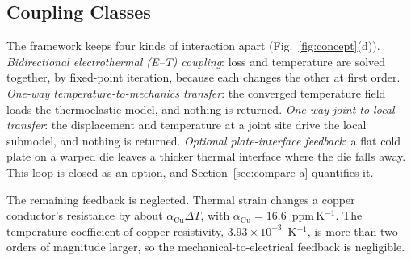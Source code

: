 \subsection{Coupling Classes}\label{sec:fw-coupling}
The framework keeps four kinds of interaction apart (Fig.~\ref{fig:concept}(d)).
\emph{Bidirectional electrothermal (E--T) coupling}: loss and temperature are solved
together, by fixed-point iteration, because each changes the other at first order. \emph{One-way temperature-to-mechanics
transfer}: the converged temperature field loads the thermoelastic model, and nothing is returned.
\emph{One-way joint-to-local transfer}: the displacement and temperature at a joint site drive the
local submodel, and nothing is returned. \emph{Optional plate-interface feedback}: a flat cold
plate on a warped die leaves a thicker thermal interface where the die falls away. This loop is
closed as an option, and Section~\ref{sec:compare-a} quantifies it.

The remaining feedback is neglected. Thermal strain changes a copper conductor's resistance by
about $\alpha_{\mathrm{Cu}}\Delta T$, with $\alpha_{\mathrm{Cu}} = 16.6$~ppm\,K$^{-1}$. The
temperature coefficient of copper resistivity, $3.93\times10^{-3}$~K$^{-1}$, is more than two
orders of magnitude larger, so the mechanical-to-electrical feedback is negligible.

